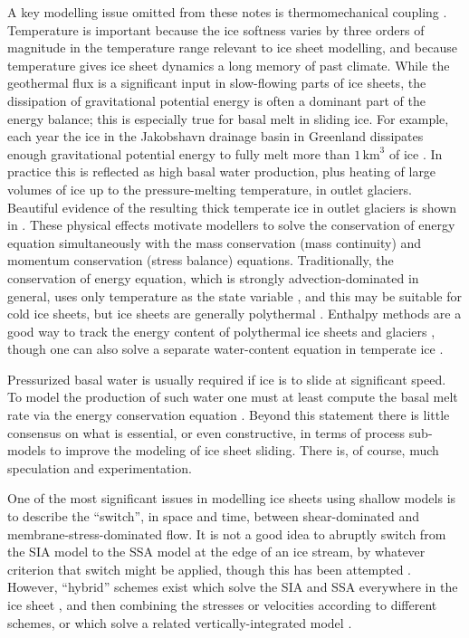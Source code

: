 \documentclass[letterpaper,final,12pt,reqno]{amsart}
\begin{document}
A key modelling issue omitted from these notes is thermomechanical coupling \cite{Blatteretal2010}.  Temperature is important because the ice softness varies by three orders of magnitude in the temperature range relevant to ice sheet modelling, and because temperature gives ice sheet dynamics a long memory of past climate.  While the geothermal flux is a significant input in slow-flowing parts of ice sheets, the dissipation of gravitational potential energy is often a dominant part of the energy balance; this is especially true for basal melt in sliding ice.  For example, each year the ice in the Jakobshavn drainage basin in Greenland dissipates enough gravitational potential energy to fully melt more than $1\,\text{km}^3$ of ice \cite{AschwandenBuelerKhroulevBlatter}.  In practice this is reflected as high basal water production, plus heating of large volumes of ice up to the pressure-melting temperature, in outlet glaciers.  Beautiful evidence of the resulting thick temperate ice in outlet glaciers is shown in \cite{Luethietal2009}.  These physical effects motivate modellers to solve the conservation of energy equation simultaneously with the mass conservation (mass continuity) and momentum conservation (stress balance) equations.  Traditionally, the conservation of energy equation, which is strongly advection-dominated in general, uses only temperature as the state variable \cite{BBL}, and this may be suitable for cold ice sheets, but ice sheets are generally polythermal \cite{FowlerLarson1978,Greve}.  Enthalpy methods are a good way to track the energy content of polythermal ice sheets and glaciers \cite{AschwandenBuelerKhroulevBlatter,GreveBlatter2016}, though one can also solve a separate water-content equation in temperate ice \cite{Greve}.

Pressurized basal water is usually required if ice is to slide at significant speed.  To model the production of such water one must at least compute the basal melt rate via the energy conservation equation \cite{BBssasliding,BuelervanPelt2015,Clarke05,Raymondenergy,Tulaczyketal2000b}.  Beyond this statement there is little consensus on what is essential, or even constructive, in terms of process sub-models to improve the modeling of ice sheet sliding.  There is, of course, much speculation and experimentation.

One of the most significant issues in modelling ice sheets using shallow models is to describe the ``switch'', in space and time, between shear-dominated and membrane-stress-dominated flow.  It is not a good idea to abruptly switch from the SIA model to the SSA model at the edge of an ice stream, by whatever criterion that switch might be applied, though this has been attempted \cite{HulbeMacAyeal,Ritzetal2001}.  However, ``hybrid'' schemes exist which solve the SIA and SSA everywhere in the ice sheet \cite{BBssasliding,Winkelmannetal2011}, and then combining the stresses or velocities according to different schemes, or which solve a related vertically-integrated model \cite{BrinkerhoffJohnson2013,Goldberg2011,PollardDeConto}.
\end{document}
